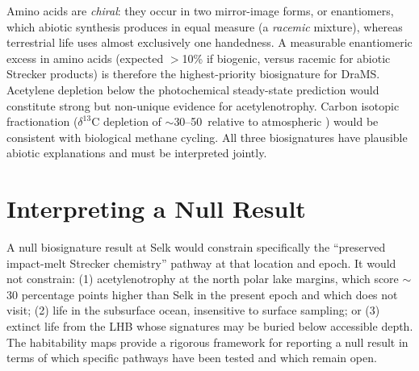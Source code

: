 Amino acids are \textit{chiral}: they occur in two mirror-image forms, or enantiomers, which abiotic synthesis produces in equal measure (a \textit{racemic} mixture), whereas terrestrial life uses almost exclusively one handedness.  A measurable enantiomeric excess in amino acids (expected $>$10\% if biogenic, versus racemic for abiotic Strecker products) is therefore the highest-priority biosignature for DraMS.  Acetylene depletion below the photochemical steady-state prediction \citep{McKaySmith2005} would constitute strong but non-unique evidence for acetylenotrophy.  Carbon isotopic fractionation ($\delta^{13}$C depletion of $\sim$30--50\,\textperthousand{} relative to atmospheric ) would be consistent with biological methane cycling.  All three biosignatures have plausible abiotic explanations and must be interpreted jointly.

\section{Interpreting a Null Result}
\label{sec:null_result}

A null biosignature result at Selk would constrain specifically the
``preserved impact-melt Strecker chemistry'' pathway at that location and
epoch.  It would not constrain: (1) acetylenotrophy at the north polar lake
margins, which score $\sim$30 percentage points higher than Selk in the present
epoch and which \dragonfly{} does not visit; (2) life in the subsurface
ocean, insensitive to surface sampling; or (3) extinct life from the LHB
whose signatures may be buried below accessible depth.  The habitability maps
provide a rigorous framework for reporting a null result in terms of which
specific pathways have been tested and which remain open.